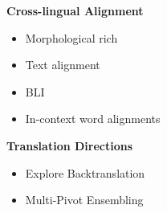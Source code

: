 \documentclass[aspectratio=169]{beamer}
\begin{document}
\begin{frame}[fragile]
\begin{minipage}{.50\textwidth}
    \footnotesize
    \textbf{Cross-lingual Alignment}
    \begin{itemize}
        \item Morphological rich \citep{ustun2019CrossLingualWordEmbeddingsMorphologically} %
        \item Text alignment \citep{artetxe2019MassivelyMultilingualSentence} %
        \item BLI \citep{bafna2024WhenYourCousin, bafna2023SimpleMethodUnsupervised, artemova2023LowresourceBilingualDialect}
        \item In-context word alignments \citep{martelli2023XLWAGoldEvaluation} %
    \end{itemize}
    \textbf{Translation Directions}
    \begin{itemize}
        \item Explore Backtranslation \citep{edunov2018UnderstandingBackTranslationScale}
        \item Multi-Pivot Ensembling \citep{mohammadshahi2023InvestigatingMultiPivotEnsembling} %
    \end{itemize}
    \end{minipage}
\end{frame}
\end{document}
